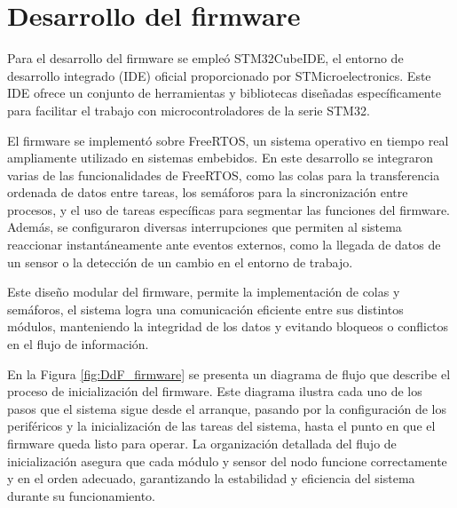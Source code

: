 \section{Desarrollo del firmware}

Para el desarrollo del firmware se empleó STM32CubeIDE, el entorno de desarrollo integrado (IDE) oficial proporcionado por STMicroelectronics. Este IDE ofrece un conjunto de herramientas y bibliotecas diseñadas específicamente para facilitar el trabajo con microcontroladores de la serie STM32. 

El firmware se implementó sobre FreeRTOS, un sistema operativo en tiempo real ampliamente utilizado en sistemas embebidos. En este desarrollo se integraron varias de las funcionalidades de FreeRTOS, como las colas para la transferencia ordenada de datos entre tareas, los semáforos para la sincronización entre procesos, y el uso de tareas específicas para segmentar las funciones del firmware. Además, se configuraron diversas interrupciones que permiten al sistema reaccionar instantáneamente ante eventos externos, como la llegada de datos de un sensor o la detección de un cambio en el entorno de trabajo.

Este diseño modular del firmware, permite la implementación de colas y semáforos, el sistema logra una comunicación eficiente entre sus distintos módulos, manteniendo la integridad de los datos y evitando bloqueos o conflictos en el flujo de información.

En la Figura \ref{fig:DdF_firmware} se presenta un diagrama de flujo que describe el proceso de inicialización del firmware. Este diagrama ilustra cada uno de los pasos que el sistema sigue desde el arranque, pasando por la configuración de los periféricos y la inicialización de las tareas del sistema, hasta el punto en que el firmware queda listo para operar. La organización detallada del flujo de inicialización asegura que cada módulo y sensor del nodo funcione correctamente y en el orden adecuado, garantizando la estabilidad y eficiencia del sistema durante su funcionamiento.

